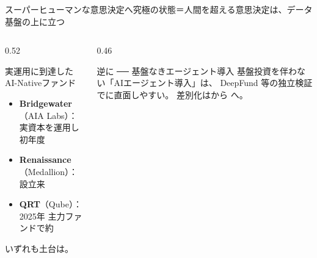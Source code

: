 \begin{frame}{スーパーヒューマンな意思決定へ}{究極の状態＝人間を超える意思決定は、データ基盤の上に立つ}
  \begin{columns}[T]
    \begin{column}{0.52\textwidth}
      \begin{casestudy}{実運用に到達したAI-Nativeファンド}
        \small
        \begin{itemize}
          \item \textbf{Bridgewater}（AIA Labs）：実資本を運用し初年度
          \item \textbf{Renaissance}（Medallion）：設立来
          \item \textbf{QRT}（Qube）：2025年 主力ファンドで約
        \end{itemize}
        \vskip1mm
        {\scriptsize\color{brandgray}
          いずれも土台は。}
      \end{casestudy}
    \end{column}
    \begin{column}{0.46\textwidth}
      \begin{insight}{逆に ── 基盤なきエージェント導入}
        \footnotesize
        基盤投資を伴わない「AIエージェント導入」は、
        DeepFund 等の独立検証でに直面しやすい。
        \vskip1mm
        差別化はから
        へ。
      \end{insight}
    \end{column}
  \end{columns}
  \vskip1mm
\end{frame}

